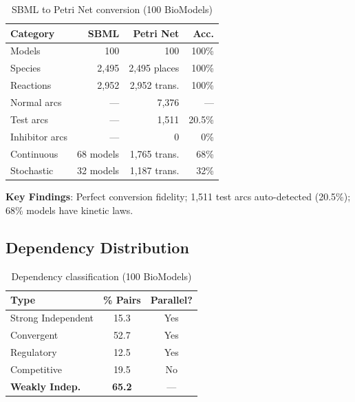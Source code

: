 \documentclass[twocolumn,11pt]{article}
\begin{document}
\begin{table}[htbp]
\small
\caption{SBML to Petri Net conversion (100 BioModels)}
\label{tab:sbml-import}
\vspace{-6pt}
\begin{tabular*}{\columnwidth}{@{\extracolsep{\fill}}lrrr@{}}
\toprule
\textbf{Category} & \textbf{SBML} & \textbf{Petri Net} & \textbf{Acc.} \\
\midrule
Models & 100 & 100 & 100\% \\
Species & 2,495 & 2,495 places & 100\% \\
Reactions & 2,952 & 2,952 trans. & 100\% \\
\midrule
Normal arcs & --- & 7,376 & --- \\
Test arcs & --- & 1,511 & 20.5\% \\
Inhibitor arcs & --- & 0 & 0\% \\
\midrule
Continuous & 68 models & 1,765 trans. & 68\% \\
Stochastic & 32 models & 1,187 trans. & 32\% \\
\bottomrule
\end{tabular*}
\vspace{-8pt}
\end{table}

\textbf{Key Findings}: Perfect conversion fidelity; 1,511 test arcs auto-detected (20.5\%); 68\% models have kinetic laws.

\subsection{Dependency Distribution}

\begin{table}[htbp]
\small
\caption{Dependency classification (100 BioModels)}
\label{tab:dependency_dist}
\vspace{-6pt}
\begin{tabular*}{\columnwidth}{@{\extracolsep{\fill}}lcc@{}}
\toprule
\textbf{Type} & \textbf{\% Pairs} & \textbf{Parallel?} \\
\midrule
Strong Independent & 15.3 & Yes \\
Convergent & 52.7 & Yes \\
Regulatory & 12.5 & Yes \\
Competitive & 19.5 & No \\
\midrule
\textbf{Weakly Indep.} & \textbf{65.2} & --- \\
\bottomrule
\end{tabular*}
\vspace{-8pt}
\end{table}
\end{document}
